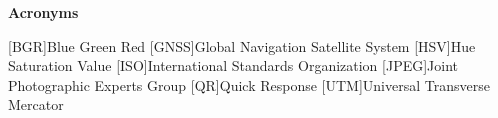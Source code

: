 
\vspace*{0.2cm}
\begin{center}
{\bf \Huge Acronyms}
\end{center}

\begin{acronym}[GNSS] %

[BGR]{Blue Green Red}
[GNSS]{Global Navigation Satellite System}
[HSV]{Hue Saturation Value}
[ISO]{International Standards Organization}
[JPEG]{Joint Photographic Experts Group}
[QR]{Quick Response}
[UTM]{Universal Transverse Mercator}

\end{acronym}





